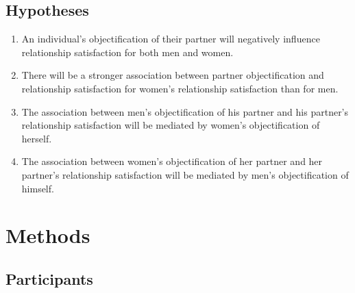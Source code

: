 \documentclass[
  man]{apa6}
\begin{document}
\hypertarget{hypotheses}{%
\subsection{Hypotheses}\label{hypotheses}}

\begin{enumerate}
\def\labelenumi{\arabic{enumi}.}
\item
  An individual's objectification of their partner will negatively influence relationship satisfaction for both men and women.
\item
  There will be a stronger association between partner objectification and relationship satisfaction for women's relationship satisfaction than for men.
\item
  The association between men's objectification of his partner and his partner's relationship satisfaction will be mediated by women's objectification of herself.
\item
  The association between women's objectification of her partner and her partner's relationship satisfaction will be mediated by men's objectification of himself.
\end{enumerate}

\hypertarget{methods}{%
\section{Methods}\label{methods}}

\hypertarget{participants}{%
\subsection{Participants}\label{participants}}
\end{document}
